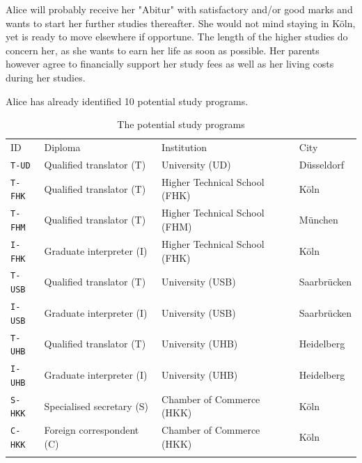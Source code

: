Alice will probably receive her "Abitur" with satisfactory and/or good marks and  wants to start her further studies thereafter. She would not mind staying in Köln, yet is ready to move elsewhere if opportune. The length of the higher studies do concern her, as she wants to earn her life as soon as possible.  Her parents however agree to financially support her study fees as well as her living costs during her studies.

Alice has already identified 10 potential study programs.
\begin{table}[h]
\caption{The potential study programs}
\label{tab:12.1}       %
\begin{center}
    \begin{tabular}{l|l|l|l}
      \svhline\noalign{\smallskip}
      ID & Diploma & Institution & City\\
      \noalign{\smallskip}\hline\noalign{\smallskip}
      \texttt{T-UD}   & Qualified translator (T)  &   University (UD)               &  Düsseldorf\\
      \texttt{T-FHK}  & Qualified translator (T)  &   Higher Technical School (FHK) &  Köln\\
      \texttt{T-FHM}  & Qualified translator (T)  &   Higher Technical School (FHM) &  München\\
      \texttt{I-FHK}  & Graduate interpreter (I)  &   Higher Technical School (FHK) &  Köln\\
      \texttt{T-USB}  & Qualified translator (T)  &   University (USB)              &  Saarbrücken\\
      \texttt{I-USB}  & Graduate interpreter (I)  &   University (USB)              &  Saarbrücken\\
      \texttt{T-UHB}  & Qualified translator (T)  &   University (UHB)              &  Heidelberg\\
      \texttt{I-UHB}  & Graduate interpreter (I)  &   University (UHB)              &  Heidelberg\\
      \texttt{S-HKK}  & Specialised secretary (S) &   Chamber of Commerce (HKK)     &  Köln\\
      \texttt{C-HKK}  & Foreign correspondent (C) &   Chamber of Commerce (HKK)     &  Köln\\
      \noalign{\smallskip}\hline
    \end{tabular}
\end{center}
\end{table}

